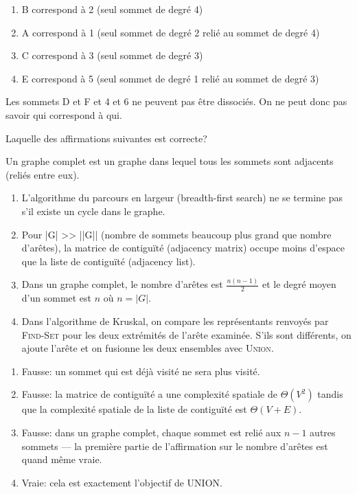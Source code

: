 \begin{Exercice}[5 minutes]
\begin{conseil}
    \end{conseil}
    \begin{solution}
        \begin{enumerate}
            \item B correspond à 2 (seul sommet de degré 4)
            \item A correspond à 1 (seul sommet de degré 2 relié au sommet de degré 4)
            \item C correspond à 3 (seul sommet de degré 3)
            \item E correspond à 5 (seul sommet de degré 1 relié au sommet de degré 3)
        \end{enumerate}
        Les sommets D et F et 4 et 6 ne peuvent pas être dissociés. On ne peut donc pas savoir qui correspond à qui.
    \end{solution}
\end{Exercice}


\begin{Exercice}[5 minutes]
Laquelle des affirmations suivantes est correcte?
\begin{conseil}
Un graphe complet est un graphe dans lequel tous les sommets sont adjacents (reliés entre eux). 
\end{conseil}
\begin{enumerate}
\item L'algorithme du parcours en largeur (breadth-first search) ne se termine pas s'il existe un cycle dans le graphe.
\item Pour |G| >> ||G|| (nombre de sommets beaucoup plus grand que nombre d'arêtes), la matrice de contiguïté (adjacency matrix) occupe moins d'espace que la liste de contiguïté (adjacency list).
\item Dans un graphe complet, le nombre d'arêtes est $\frac{n(n-1)}{2}$ et le degré moyen d'un sommet est $n$ où $n=|G|$.
\item Dans l'algorithme de Kruskal, on compare les représentants renvoyés par \textsc{Find-Set} pour les deux extrémités de l'arête examinée. S'ils sont différents, on ajoute l'arête et on fusionne les deux ensembles avec \textsc{Union}. 
\end{enumerate}
\begin{solution}
    \begin{enumerate}
        \item Fausse: un sommet qui est déjà visité ne sera plus visité.
        \item Fausse: la matrice de contiguïté a une complexité spatiale de $\Theta(V^2)$ tandis que la complexité spatiale de la liste de contiguïté est $\Theta(V+E)$. 
        \item Fausse: dans un graphe complet, chaque sommet est relié aux $n-1$ autres sommets — la première partie de l'affirmation sur le nombre d'arêtes est quand même vraie.
        \item Vraie: cela est exactement l'objectif de \textsc{UNION}. 
    \end{enumerate}
 
\end{solution}
\end{Exercice}

